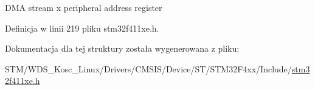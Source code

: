 D\+MA stream x peripheral address register 

Definicja w linii 219 pliku stm32f411xe.\+h.



Dokumentacja dla tej struktury została wygenerowana z pliku\+:\begin{DoxyCompactItemize}
\item 
S\+T\+M/\+W\+D\+S\+\_\+\+Kosc\+\_\+\+Linux/\+Drivers/\+C\+M\+S\+I\+S/\+Device/\+S\+T/\+S\+T\+M32\+F4xx/\+Include/\hyperlink{stm32f411xe_8h}{stm32f411xe.\+h}\end{DoxyCompactItemize}
